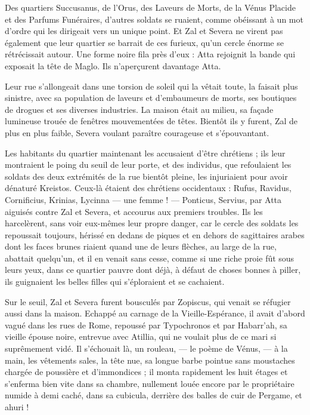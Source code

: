 \documentclass[a4paper, 11pt, oneside, polutonikogreek, french]{article}
\begin{document}
Des quartiers Succusanus, de l'Orus, des Laveurs de Morts, de la Vénus Placide et des Parfums Funéraires, d'autres soldats se ruaient, comme obéissant à un mot d'ordre qui les dirigeait vers un unique point. Et Zal et Severa ne virent pas également que leur quartier se barrait de ces furieux, qu'un cercle énorme se rétrécissait autour. Une forme noire fila près d'eux : Atta rejoignit la bande qui exposait la tête de Maglo. Ils n'aperçurent davantage Atta.

Leur rue s'allongeait dans une torsion de soleil qui la vêtait toute, la faisait plus sinistre, avec sa population de laveurs et d'embaumeurs de morts, ses boutiques de drogues et ses diverses industries. La maison était au milieu, sa façade lumineuse trouée de fenêtres mouvementées de têtes. Bientôt ils y furent, Zal de plus en plus faible, Severa voulant paraître courageuse et s'épouvantant.

Les habitants du quartier maintenant les accusaient d'être chrétiens ; ils leur montraient le poing du seuil de leur porte, et des individus, que refoulaient les soldats des deux extrémités de la rue bientôt pleine, les injuriaient pour avoir dénaturé Kreistos. Ceux-là étaient des chrétiens occidentaux : Rufus, Ravidus, Cornificius, Krinias, Lycinna --- une femme ! --- Ponticus, Servius, par Atta aiguisés contre Zal et Severa, et accourus aux premiers troubles. Ils les harcelèrent, sans voir eux-mêmes leur propre danger, car le cercle des soldats les repoussait toujours, hérissé en dedans de piques et en dehors de sagittaires arabes dont les faces brunes riaient quand une de leurs flèches, au large de la rue, abattait quelqu'un, et il en venait sans cesse, comme si une riche proie fût sous leurs yeux, dans ce quartier pauvre dont déjà, à défaut de choses bonnes à piller, ils guignaient les belles filles qui s'éploraient et se cachaient.

Sur le seuil, Zal et Severa furent bousculés par Zopiscus, qui venait se réfugier aussi dans la maison. Echappé au carnage de la Vieille-Espérance, il avait d'abord vagué dans les rues de Rome, repoussé par Typochronos et par Habarr'ah, sa vieille épouse noire, entrevue avec Atillia, qui ne voulait plus de ce mari si suprêmement vidé. Il s'échouait là, un rouleau, --- le poème de Vénus, --- à la main, les vêtements sales, la tête nue, sa longue barbe pointue sans moustaches chargée de poussière et d'immondices ; il monta rapidement les huit étages et s'enferma bien vite dans sa chambre, nullement louée encore par le propriétaire numide à demi caché, dans sa cubicula, derrière des balles de cuir de Pergame, et ahuri !
\end{document}
